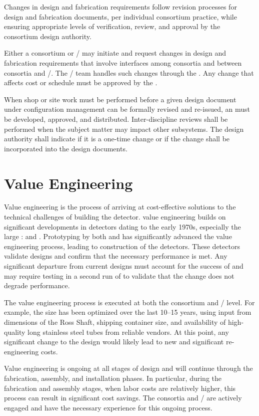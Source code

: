 Changes in design and fabrication requirements follow revision
processes for design and fabrication documents, per individual
consortium practice, while ensuring appropriate levels of
verification, review, and approval by the consortium design authority.

Either a consortium or / may initiate and request
changes in design and fabrication requirements that involve interfaces
among consortia and between consortia and /.  The
/ team handles such changes through the
. Any change that affects cost or schedule must be approved
by the .

When shop or site work must be performed before a given 
design
document under configuration management can be formally revised and re-issued, 
an  must be developed, approved, and distributed. 
Inter-discipline reviews shall be
performed when the  subject matter may impact other
subsystems. The design authority shall indicate if it is a one-time
change or if the change shall be incorporated into the design
documents. 



\section{Value Engineering}
\label{sec:fdsp-coord-ve}

Value engineering is the process of arriving at cost-effective
solutions to the technical challenges of building the 
detector.  value engineering builds on significant
developments in  detectors dating to the early 1970s,
especially the large :  and
. Prototyping by both  and  has
significantly advanced the value engineering process, leading to
construction of the  detectors. These detectors validate
 designs and confirm that the necessary performance is
met. Any significant departure from current designs must account for
the success of   and may require testing in a second
run of  to validate that the change does not degrade performance. 

The value engineering process is executed at both the consortium and
/ level. For example, the  size has been optimized
over the last 10--15 years, using input from dimensions of the Ross
Shaft, shipping container size, and availability of high-quality long
stainless steel tubes from reliable vendors.  At this point, any
significant change to the  design would likely lead to new
and significant re-engineering costs.

Value engineering is ongoing at all stages of design and will continue
through the fabrication, assembly, and installation phases. In
particular, during the fabrication and assembly stages, when labor costs
are relatively higher, this process can result in significant cost savings. The
consortia and / are actively engaged and have the necessary
experience for this ongoing process.
